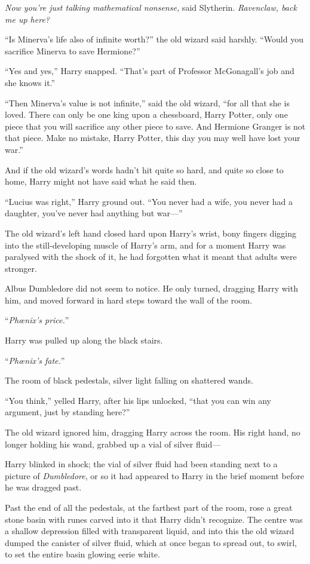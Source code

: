 \emph{Now you’re just talking mathematical nonsense,} said Slytherin. \emph{Ravenclaw, back me up here?}

“Is Minerva’s life also of infinite worth?” the old wizard said harshly. “Would you sacrifice Minerva to save Hermione?”

“Yes and yes,” Harry snapped. “That’s part of Professor McGonagall’s job and she knows it.”

“Then Minerva’s value is not infinite,” said the old wizard, “for all that she is loved. There can only be one king upon a chessboard, Harry Potter, only one piece that you will sacrifice any other piece to save. And Hermione Granger is not that piece. Make no mistake, Harry Potter, this day you may well have lost your war.”

And if the old wizard’s words hadn’t hit quite so hard, and quite so close to home, Harry might not have said what he said then.

“Lucius was right,” Harry ground out. “You never had a wife, you never had a daughter, you’ve never had anything but war—”

The old wizard’s left hand closed hard upon Harry’s wrist, bony fingers digging into the still-developing muscle of Harry’s arm, and for a moment Harry was paralysed with the shock of it, he had forgotten what it meant that adults were stronger.

Albus Dumbledore did not seem to notice. He only turned, dragging Harry with him, and moved forward in hard steps toward the wall of the room.

“\emph{Phœnix’s price.}”

Harry was pulled up along the black stairs.

“\emph{Phœnix’s fate.}”

The room of black pedestals, silver light falling on shattered wands.

“You think,” yelled Harry, after his lips unlocked, “that you can win any argument, just by standing here?”

The old wizard ignored him, dragging Harry across the room. His right hand, no longer holding his wand, grabbed up a vial of silver fluid—

Harry blinked in shock; the vial of silver fluid had been standing next to a picture of \emph{Dumbledore}, or so it had appeared to Harry in the brief moment before he was dragged past.

Past the end of all the pedestals, at the farthest part of the room, rose a great stone basin with runes carved into it that Harry didn’t recognize. The centre was a shallow depression filled with transparent liquid, and into this the old wizard dumped the canister of silver fluid, which at once began to spread out, to swirl, to set the entire basin glowing eerie white.


